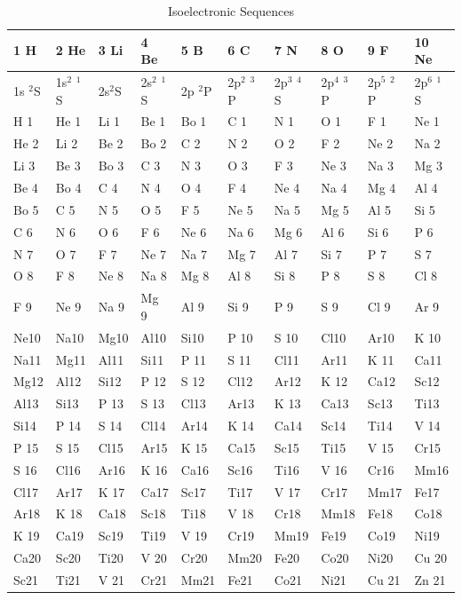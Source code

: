 \begin{table}
\begin{center}
\label{tab:IsoSequences}
\caption{Isoelectronic Sequences}
\begin{tabular}{llllllllll}
\hline
1 H&   2 He&  3 Li&  4 Be&  5 B&  6 C&  7 N&  8 O&  9 F&  10 Ne\\
\hline
1s $^2$S& 1s$^2$ $^1$S& 2s$^2$S& 2s$^2$ $^1$S& 2p $^2$P& 2p$^2$ $^3$P&
2p$^3$ $^4$S& 2p$^4$ $^3$P& 2p$^5$ $^2$P& 2p$^6$ $^1$S\\
H 1& He 1& Li 1& Be 1& Bo 1& C 1& N 1& O 1& F 1& Ne 1\\
He 2& Li 2& Be 2& Bo 2& C 2& N 2& O 2& F 2& Ne 2& Na 2\\
Li 3& Be 3& Bo 3& C 3& N 3& O
3& F 3& Ne 3& Na 3& Mg 3\\
Be 4& Bo 4& C 4& N 4& O 4& F 4& Ne 4& Na 4& Mg 4& Al 4\\
Bo 5& C 5& N 5& O
5& F 5& Ne 5& Na 5& Mg 5& Al 5& Si 5\\
C 6& N 6& O 6& F 6& Ne 6& Na 6& Mg 6& Al 6& Si 6& P 6\\
N 7& O 7& F 7& Ne 7& Na 7& Mg 7& Al 7& Si 7& P 7& S 7\\
O 8& F  8& Ne 8& Na 8& Mg 8& Al 8& Si 8& P  8& S  8&Cl 8\\
F 9& Ne 9& Na 9& Mg 9& Al 9& Si 9& P  9& S 9& Cl 9& Ar 9\\
 Ne10& Na10&Mg10& Al10& Si10& P 10& S
10& Cl10& Ar10& K 10\\
Na11& Mg11& Al11& Si11& P 11& S 11& Cl11& Ar11& K 11& Ca11\\
 Mg12& Al12&
Si12& P 12& S
12& Cl12& Ar12& K 12& Ca12& Sc12\\
Al13& Si13& P 13& S 13& Cl13& Ar13& K 13& Ca13& Sc13& Ti13\\
Si14& P 14&
S 14& Cl14& Ar14& K 14& Ca14& Sc14& Ti14& V 14\\
P 15& S 15& Cl15& Ar15& K 15& Ca15& Sc15& Ti15& V 15& Cr15\\
S 16& Cl16& Ar16& K 16& Ca16& Sc16& Ti16& V 16& Cr16& Mm16\\
Cl17& Ar17&K 17& Ca17& Sc17& Ti17& V 17& Cr17& Mm17& Fe17\\
Ar18& K 18& Ca18& Sc18& Ti18& V 18& Cr18& Mm18& Fe18& Co18\\
K 19& Ca19& Sc19& Ti19& V
19& Cr19& Mm19& Fe19& Co19& Ni19\\
Ca20& Sc20& Ti20& V 20& Cr20& Mm20& Fe20& Co20& Ni20& Cu 20\\
Sc21& Ti21& V
21& Cr21& Mm21& Fe21& Co21& Ni21& Cu 21& Zn 21\\

\end{tabular}
\end{center}
\end{table}
